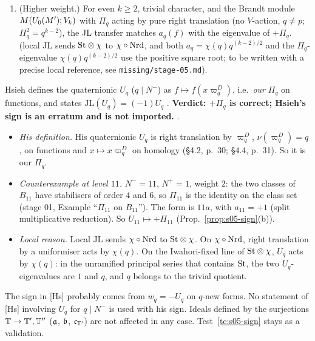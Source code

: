\begin{proposition}[$\varepsilon=+1$; exponent $+1$]
\begin{enumerate}[label=(\alph*)]
  that it holds for $\Xq(J_s)$ with Picard functoriality is part of (X1) and is checked by test \ref{tc:s05-exp}).
\item (Higher weight.) For even $k\ge2$, trivial character, and the Brandt module $M(U_0(M');V_k)$ with $\Pi_q$ acting
  by pure right translation (no $V$-action, $q\ne p$; $\Pi_q^2=q^{k-2}$), the JL transfer matches $a_q(f)$ with the eigenvalue of
  $+\Pi_q$. \stexp{} (local JL sends $\mathrm{St}\otimes\chi$ to $\chi\circ\mathrm{Nrd}$, and both $a_q=\chi(q)q^{(k-2)/2}$ and the
  $\Pi_q$-eigenvalue $\chi(q)q^{(k-2)/2}$ use the positive square root; to be written with a precise local reference, see
  \texttt{missing/stage-05.md}).
\end{enumerate}
\end{proposition}

\begin{remark}[Hsieh's $\mathrm{JL}(U_q)=-U_q$]\label{rem:s05-hsieh}
Hsieh defines the quaternionic $U_q$ ($q\mid N^-$) as $f\mapsto f(x\varpi^D_q)$, i.e.\ \emph{our} $\Pi_q$ on functions, and
states $\mathrm{JL}(U_q)=(-1)U_q$
. \textbf{Verdict: $+\Pi_q$ is correct; Hsieh's sign is an erratum and is not imported.} \stpmc.
\begin{itemize}
\item \emph{His definition.} His quaternionic $U_q$ is right translation by $\varpi^D_q$, $\nu(\varpi^D_q)=q$, on functions and
  $x\mapsto x\varpi^D_q$ on homology (\S4.2, p.~30; \S4.4, p.~31). So it is our $\Pi_q$.
\item \emph{Counterexample at level $11$.} $N^-=11$, $N^+=1$, weight $2$: the two classes of $B_{11}$ have stabilisers of order
  $4$ and $6$, so $\Pi_{11}$ is the identity on the class set (stage 01, Example ``$\Pi_{11}$ on $B_{11}$''). The form is $11a$,
  with $a_{11}=+1$ (split multiplicative reduction). So $U_{11}\mapsto+\Pi_{11}$ (Prop.~\ref{prop:s05-sign}(b)).
\item \emph{Local reason.} Local JL sends $\chi\circ\mathrm{Nrd}$ to $\mathrm{St}\otimes\chi$. On $\chi\circ\mathrm{Nrd}$, right translation by a
  uniformiser acts by $\chi(q)$. On the Iwahori-fixed line of $\mathrm{St}\otimes\chi$, $U_q$ acts by $\chi(q)$: in the unramified
  principal series that contains $\mathrm{St}$, the two $U_q$-eigenvalues are $1$ and $q$, and $q$ belongs to the trivial quotient.
\end{itemize}
The sign in [Hs] probably comes from $w_q=-U_q$ on $q$-new forms. No statement of [Hs] involving $U_q$ for $q\mid N^-$ is used
with his sign. Ideals defined by the surjections $\mathbb{T}\to\mathbb{T}',\mathbb{T}''$ ($\mathfrak{a}$, $\mathfrak{b}$, $\mathfrak{c}_{\mathbb{T}'}$) are not affected in any case.
Test~\ref{tc:s05-sign} stays as a validation.
\end{remark}

